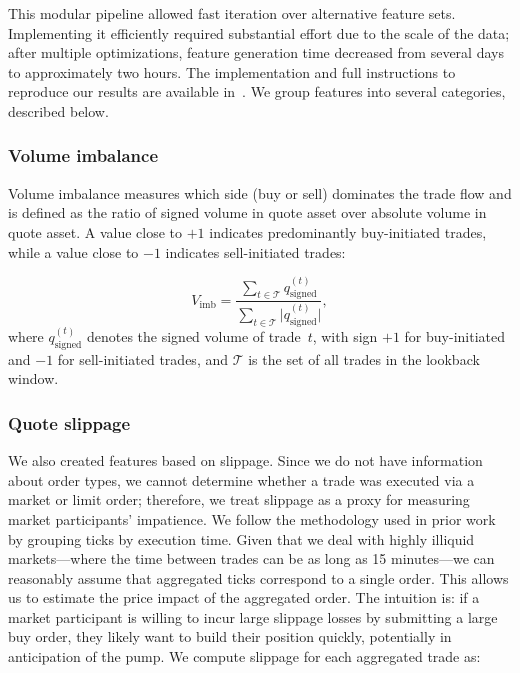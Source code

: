 \documentclass{ieeeaccess}
\begin{document}
This modular pipeline allowed fast iteration over alternative feature sets. Implementing it efficiently required substantial effort due to the scale of the data; after multiple optimizations, feature generation time decreased from several days to approximately two hours. The implementation and full instructions to reproduce our results are available in~\cite{code_github}. We group features into several categories, described below.

\subsubsection{Volume imbalance}

Volume imbalance measures which side (buy or sell) dominates the trade flow and is defined as the ratio of signed volume in quote asset over absolute volume in quote asset. A value close to $+1$ indicates predominantly buy-initiated trades, while a value close to $-1$ indicates sell-initiated trades:

\begin{equation}
    V_{\mathrm{imb}} = \frac{\sum_{t \in \mathcal{T}} q^{(t)}_{\mathrm{signed}}}{\sum_{t \in \mathcal{T}} \lvert q^{(t)}_{\mathrm{signed}} \rvert},
    \label{eq:volume_imbalance}
\end{equation}
where $q^{(t)}_{\mathrm{signed}}$ denotes the signed volume of trade~$t$, with sign $+1$ for buy-initiated and $-1$ for sell-initiated trades, and $\mathcal{T}$ is the set of all trades in the lookback window.

\subsubsection{Quote slippage}

We also created features based on slippage. Since we do not have information about order types, we cannot determine whether a trade was executed via a market or limit order; therefore, we treat slippage as a proxy for measuring market participants' impatience. We follow the methodology used in prior work by grouping ticks by execution time. Given that we deal with highly illiquid markets---where the time between trades can be as long as 15 minutes---we can reasonably assume that aggregated ticks correspond to a single order. This allows us to estimate the price impact of the aggregated order. The intuition is: if a market participant is willing to incur large slippage losses by submitting a large buy order, they likely want to build their position quickly, potentially in anticipation of the pump. We compute slippage for each aggregated trade as:
\end{document}
